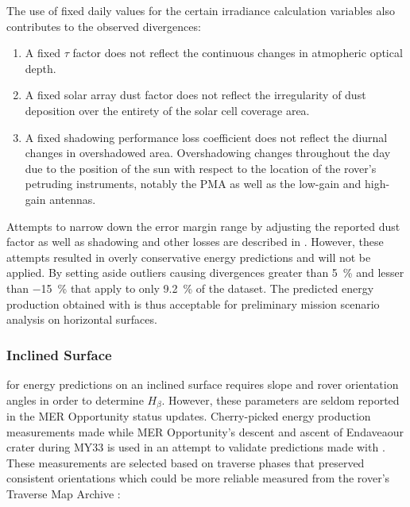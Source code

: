 \vspace{0.5cm}



The use of fixed daily values for the certain irradiance calculation variables also contributes to the observed divergences:

\begin{enumerate}[label=\textcolor{BulletBlue}{(\alph*)}]
  \item A fixed $\tau$ factor does not reflect the continuous changes in atmopheric optical depth.
  \item A fixed solar array dust factor does not reflect the irregularity of dust deposition over the entirety of the solar cell coverage area.
  \item A fixed shadowing performance loss coefficient does not reflect the diurnal changes in overshadowed area. Overshadowing changes throughout the day due to the position of the sun with respect to the location of the rover's petruding instruments, notably the \ac{PMA} as well as the low-gain and high-gain antennas.
\end{enumerate}

Attempts to narrow down the error margin range by adjusting the reported dust factor as well as shadowing and other losses are described in . However, these attempts resulted in overly conservative energy predictions and will not be applied. By setting aside outliers causing divergences greater than \SI{5}{\percent} and lesser than \SI{-15}{\percent} that apply to only \SI{9.2}{\percent} of the dataset. The predicted energy production obtained with  is thus acceptable for preliminary mission scenario analysis on horizontal surfaces.

\subsubsection{Inclined Surface}
\label{sec:PowerAndEnergyPredictions:Validation:InclinedSurface}

 for energy predictions on an inclined surface requires slope and rover orientation angles in order to determine $H_{\beta}$. However, these parameters are seldom reported in the \ac{MER} Opportunity status updates. Cherry-picked energy production measurements made while \ac{MER} Opportunity's descent and ascent of Endaveaour crater during \ac{MY}33 is used in an attempt to validate predictions made with . These measurements are selected based on traverse phases that preserved consistent orientations which could be more reliable measured from the rover's Traverse Map Archive :

